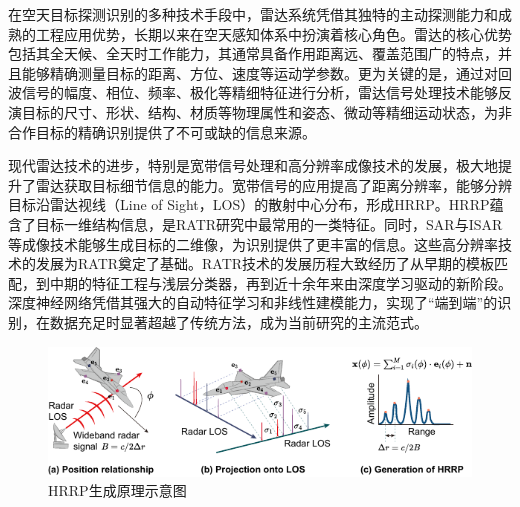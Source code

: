 在空天目标探测识别的多种技术手段中，雷达系统凭借其独特的主动探测能力和成熟的工程应用优势，长期以来在空天感知体系中扮演着核心角色。雷达的核心优势包括其全天候、全天时工作能力，其通常具备作用距离远、覆盖范围广的特点，并且能够精确测量目标的距离、方位、速度等运动学参数。更为关键的是，通过对回波信号的幅度、相位、频率、极化等精细特征进行分析，雷达信号处理技术能够反演目标的尺寸、形状、结构、材质等物理属性和姿态、微动等精细运动状态，为非合作目标的精确识别提供了不可或缺的信息来源。

现代雷达技术的进步，特别是宽带信号处理和高分辨率成像技术的发展，极大地提升了雷达获取目标细节信息的能力。宽带信号的应用提高了距离分辨率，能够分辨目标沿雷达视线（Line of Sight，LOS）的散射中心分布，形成HRRP。HRRP蕴含了目标一维结构信息，是RATR研究中最常用的一类特征。同时，SAR与ISAR等成像技术能够生成目标的二维像，为识别提供了更丰富的信息。这些高分辨率技术的发展为RATR奠定了基础。RATR技术的发展历程大致经历了从早期的模板匹配，到中期的特征工程与浅层分类器，再到近十余年来由深度学习驱动的新阶段。深度神经网络凭借其强大的自动特征学习和非线性建模能力，实现了“端到端”的识别，在数据充足时显著超越了传统方法，成为当前研究的主流范式。

\begin{figure}[h!]
    \centering
    \includegraphics[width=0.8\linewidth]{figures/hrrp_aspect.pdf}
    \caption{HRRP生成原理示意图}
    \label{fig:hrrp_generation}
\end{figure}

